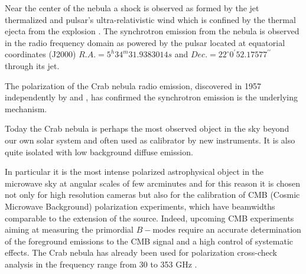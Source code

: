\documentclass[twocolumn,traditabstract]{aa}
\begin{document}
Near the center of the nebula a shock is observed as formed by the jet thermalized and pulsar's ultra-relativistic wind which is confined by the thermal ejecta from the explosion \citep{2000ApJ...536L..81W,2011A&A...528A..11W}.  
The synchrotron emission from the nebula is observed in the radio frequency domain as powered by the pulsar located at equatorial coordinates (J2000) $R.A. = 5^h34^m31.9383014s$ and $Dec. = 22^{\circ}0^{\prime}52.17577^{\prime\prime}$ \citep{Lobanov} through its jet.

The polarization of the Crab nebula radio emission, discovered in 1957 independently by \citet{1957ApJ...126..468M} and \citet{1959SvA.....3...39K}, has confirmed the synchrotron emission is the underlying mechanism. 

Today the Crab nebula is perhaps the most observed object in the sky beyond our own solar system \citep{2008ARA&A..46..127H} and often used as calibrator by new instruments. It is also quite isolated
with low background diffuse emission. 

In particular it is the most intense polarized astrophysical object in the microwave sky
at angular scales of few arcminutes and for this reason it is chosen not only for high resolution cameras
but also for the calibration of
CMB (Cosmic Microwave Background) polarization experiments, which have
beamwidths comparable to the extension of the source. 
Indeed, upcoming CMB experiments aiming at measuring the primordial $B-$modes require an accurate
determination of the foreground emissions to the CMB signal and a high control
of systematic effects.
The Crab nebula has already been used for polarization cross-check analysis in the frequency
range from 30 to 353 GHz \citep{2011ApJS..192...19W,2015arXiv150702058P}.
\end{document}

